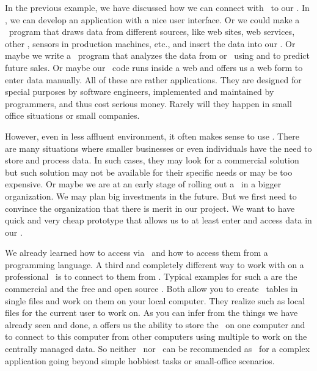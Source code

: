 %
%
\label{sec:accessingDbFromLibreOfficeBase}%
%
In the previous example, we have discussed how we can connect with \python\ to our \dbms.
In \python, we can develop an application with a nice user interface.
Or we could make a \python\ program that draws data from different sources, like web sites, web services, other , sensors in production machines, etc., and insert the data into our \db.
Or maybe we write a \python\ program that analyzes the data from or \db\ using  and  to predict future sales.
Or maybe our \python\ code runs inside a web  and offers us a web form to enter data manually.
All of these are rather  applications.
They are designed for special purposes by software engineers, implemented and maintained by programmers, and thus cost serious money.
Rarely will they happen in small office situations or small companies.

However, even in less affluent environment, it often makes sense to use .
There are many situations where smaller businesses or even individuals have the need to store and process data.
In such cases, they may look for a commercial solution but such solution may not be available for their specific needs or may be too expensive.
Or maybe we are at an early stage of rolling out a \db\ in a bigger organization.
We may plan big investments in the future.
But we first need to convince the organization that there is merit in our project.
We want to have quick and very cheap prototype that allows us to at least enter and access data in our \db.

We already learned how to access  via \sql\ and how to access them from a programming language.
A third and completely different way to work with  on a professional \dbms\ is to connect to them from .
Typical examples for such a  are the commercial \microsoftAccess\cite{SSI2023MA2BTA,B2020HOMA2,UC2021AFD} and the free and open source \libreofficeBase\cite{FNFHWSKLSSGLFRSRPLJG2022BG7R1BOL7C,S2022L7PFEUU}.
Both allow you to create \db\ tables in single files and work on them on your local computer.
They realize such  as local files for the current user to work on.
As you can infer from the things we have already seen and done, a  offers us the ability to store the \db\ on one computer and to connect to this computer from other computers using multiple  to work on the centrally managed data.
So neither \microsoftAccess\ nor \libreofficeBase\ can be recommended as \dbms\ for a complex application going beyond simple hobbiest tasks or small-office scenarios.

